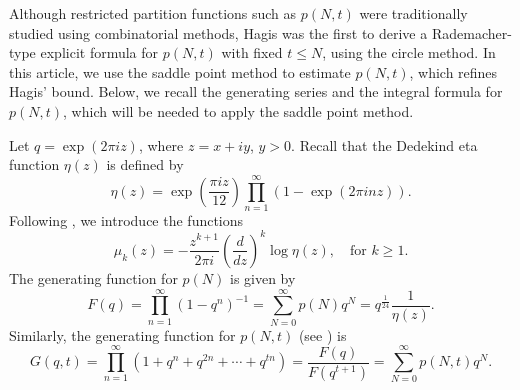 \documentclass[11pt]{amsart}
\theoremstyle{plain}
\numberwithin{equation}{section}
\begin{document}
	
	Although restricted partition functions such as $p(N,t)$ were traditionally studied using combinatorial methods, Hagis \cite{hagis1963partitions, hagis1971partitions} was the first to derive a Rademacher-type \cite{rademacher1938partition} explicit formula for $p(N,t)$ with fixed $t \le N$, using the circle method. 
	In this article, we use the saddle point method to estimate $p(N,t)$, which refines Hagis' bound. Below, we recall the generating series and the integral formula for $p(N,t)$, which will be needed to apply the saddle point method.
	
	Let $q=\exp(2\pi iz)$, where $z=x+iy$, $y>0$. Recall that the Dedekind eta function $\eta(z)$ is defined by
	\begin{equation}\label{eq-eta}
		\eta(z)=\exp\left(\frac{\pi iz}{12}\right)\prod_{n=1}^{\infty}(1-\exp(2\pi inz)).   
	\end{equation}
	Following \cite{tyler2024asymptotics}, we introduce the functions
	\begin{equation}\label{demu(z)}
		\mu_{k}(z)=-\frac{z^{k+1}}{2\pi i} \left(\frac{d}{dz}\right)^{k} \log\eta(z),\quad \text{for $k\ge 1$}.
	\end{equation}
	The generating function for $p(N)$ \cite{euler1797introductio} is given by
	\begin{equation*}
		F(q)=\prod_{n=1}^{\infty}(1-q^{n})^{-1}=\sum_{N=0}^{\infty}p(N)q^{N}=q^{\frac{1}{24}}\frac{1}{\eta(z)}.
	\end{equation*}
	Similarly, the generating function for $p(N,t)$ (see \cite[(2.2)]{hagis1971partitions}) is 
	\begin{equation*}
		G(q,t)=\prod_{n=1}^{\infty}(1+q^{n}+q^{2n}+\cdots+q^{tn})=\frac{F(q)}{F(q^{t+1})}=\sum_{N=0}^{\infty}p(N,t)q^{N}.
	\end{equation*}
	
\end{document}
